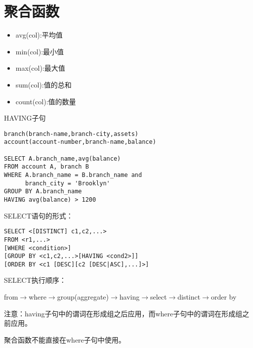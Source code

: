 \section{聚合函数}
\begin{itemize}
    \item avg(col):平均值
    \item min(col):最小值
    \item max(col):最大值
    \item sum(col):值的总和
    \item count(col):值的数量
\end{itemize}

HAVING子句
\begin{lstlisting}[style=sqlstyle]
branch(branch-name,branch-city,assets)
account(account-number,branch-name,balance)

SELECT A.branch_name,avg(balance)
FROM account A, branch B
WHERE A.branch_name = B.branch_name and 
      branch_city = 'Brooklyn'
GROUP BY A.branch_name
HAVING avg(balance) > 1200
\end{lstlisting}

SELECT语句的形式：
\begin{lstlisting}[style=sqlstyle]
SELECT <[DISTINCT] c1,c2,...>
FROM <r1,...>
[WHERE <condition>]
[GROUP BY <c1,c2,...>[HAVING <cond2>]]
[ORDER BY <c1 [DESC][c2 [DESC|ASC],...]>]    
\end{lstlisting}

SELECT执行顺序：

from$\to$where$\to$group(aggregate)$\to$having$\to$select$\to$distinct$\to$order by

注意：having子句中的谓词在形成组之后应用，而where子句中的谓词在形成组之前应用。

聚合函数不能直接在where子句中使用。